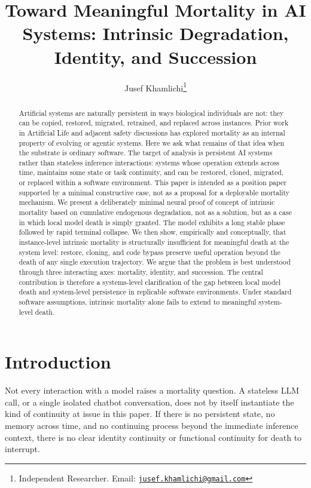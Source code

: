 \documentclass[11pt]{article}
\title{Toward Meaningful Mortality in AI Systems: Intrinsic Degradation, Identity, and Succession}
\author{Jusef Khamlichi\thanks{Independent Researcher. Email: \href{mailto:jusef.khamlichi@gmail.com}{\texttt{jusef.khamlichi@gmail.com}}}}
\date{}
\begin{document}
\maketitle

\begin{abstract}
Artificial systems are naturally persistent in ways biological individuals are not: they can be copied, restored, migrated, retrained, and replaced across instances. Prior work in Artificial Life and adjacent safety discussions has explored mortality as an internal property of evolving or agentic systems. Here we ask what remains of that idea when the substrate is ordinary software. The target of analysis is persistent AI systems rather than stateless inference interactions: systems whose operation extends across time, maintains some state or task continuity, and can be restored, cloned, migrated, or replaced within a software environment. This paper is intended as a position paper supported by a minimal constructive case, not as a proposal for a deployable mortality mechanism. We present a deliberately minimal neural proof of concept of intrinsic mortality based on cumulative endogenous degradation, not as a solution, but as a case in which local model death is simply granted. The model exhibits a long stable phase followed by rapid terminal collapse. We then show, empirically and conceptually, that instance-level intrinsic mortality is structurally insufficient for meaningful death at the system level: restore, cloning, and code bypass preserve useful operation beyond the death of any single execution trajectory. We argue that the problem is best understood through three interacting axes: mortality, identity, and succession. The central contribution is therefore a systems-level clarification of the gap between local model death and system-level persistence in replicable software environments. Under standard software assumptions, intrinsic mortality alone fails to extend to meaningful system-level death.
\end{abstract}

\newpage
\section{Introduction}

Not every interaction with a model raises a mortality question. A stateless LLM call, or a single isolated chatbot conversation, does not by itself instantiate the kind of continuity at issue in this paper. If there is no persistent state, no memory across time, and no continuing process beyond the immediate inference context, there is no clear identity continuity or functional continuity for death to interrupt.
\end{document}
